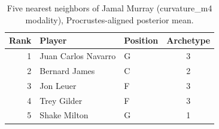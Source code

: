 \begin{table}[htbp]
  \centering\small
  \begin{tabular}{rllc}
    \toprule
    Rank & Player & Position & Archetype \\
    \midrule
    1 & Juan Carlos Navarro & G & 3 \\
    2 & Bernard James & C & 2 \\
    3 & Jon Leuer & F & 3 \\
    4 & Trey Gilder & F & 3 \\
    5 & Shake Milton & G & 1 \\
    \bottomrule
  \end{tabular}
  \caption{Five nearest neighbors of Jamal Murray (curvature_m4 modality), Procrustes-aligned posterior mean.}
  \label{tab:Jamal_Murray_neighbors_curvature_m4}
\end{table}

